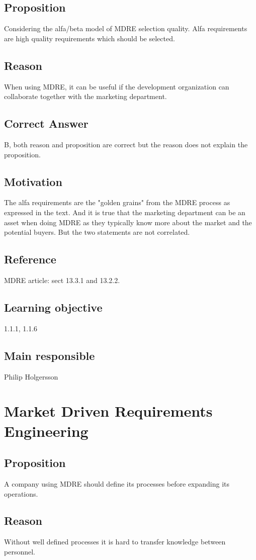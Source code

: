 \documentclass[a4paper]{article}
\begin{document}
\subsection*{Proposition}
Considering the alfa/beta model of MDRE selection quality. Alfa requirements are high quality requirements which should be selected.
\subsection*{Reason}
When using MDRE, it can be useful if the development organization can collaborate together with the marketing department.
\subsection*{Correct Answer}
B, both reason and proposition are correct but the reason does not explain the proposition.
\subsection*{Motivation}
The alfa requirements are the "golden grains" from the MDRE process as expressed in the text. And it is true that the marketing department can be an asset when doing MDRE as they typically know more about the market and the potential buyers. But the two statements are not correlated.
\subsection*{Reference}
MDRE article: sect 13.3.1 and 13.2.2.
\subsection*{Learning objective}
1.1.1, 1.1.6
\subsection*{Main responsible}
Philip Holgersson

\section{Market Driven Requirements Engineering}
\subsection*{Proposition}
A company using MDRE should define its processes before expanding its operations.
\subsection*{Reason}
Without well defined processes it is hard to transfer knowledge between personnel. 
\end{document}
